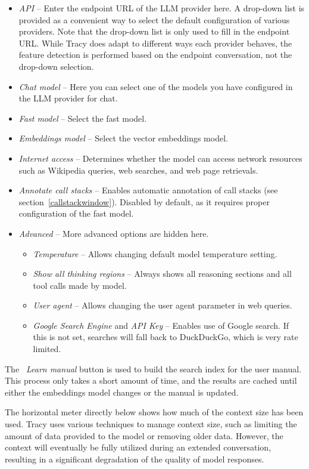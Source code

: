 \documentclass[hidelinks,titlepage,a4paper,twoside]{article}
\begin{document}
\begin{itemize}
\item \emph{API} -- Enter the endpoint URL of the LLM provider here. A drop-down list is provided as a convenient way to select the default configuration of various providers. Note that the drop-down list is only used to fill in the endpoint URL. While Tracy does adapt to different ways each provider behaves, the feature detection is performed based on the endpoint conversation, not the drop-down selection.
\item \emph{Chat model} -- Here you can select one of the models you have configured in the LLM provider for chat.
\item \emph{Fast model} -- Select the fast model.
\item \emph{Embeddings model} -- Select the vector embeddings model.
\item \emph{Internet access} -- Determines whether the model can access network resources such as Wikipedia queries, web searches, and web page retrievals.
\item \emph{Annotate call stacks} -- Enables automatic annotation of call stacks (see section~\ref{callstackwindow}). Disabled by default, as it requires proper configuration of the fast model.
\item \emph{Advanced} -- More advanced options are hidden here.
\begin{itemize}
\item \emph{Temperature} -- Allows changing default model temperature setting.
\item \emph{Show all thinking regions} -- Always shows all reasoning sections and all tool calls made by model.
\item \emph{User agent} -- Allows changing the user agent parameter in web queries.
\item \emph{Google Search Engine} and \emph{API Key} -- Enables use of Google search. If this is not set, searches will fall back to DuckDuckGo, which is very rate limited.
\end{itemize}
\end{itemize}

The \emph{\faBook{}~Learn manual} button is used to build the search index for the user manual. This process only takes a short amount of time, and the results are cached until either the embeddings model changes or the manual is updated.

The horizontal meter directly below shows how much of the context size has been used. Tracy uses various techniques to manage context size, such as limiting the amount of data provided to the model or removing older data. However, the context will eventually be fully utilized during an extended conversation, resulting in a significant degradation of the quality of model responses.
\end{document}
